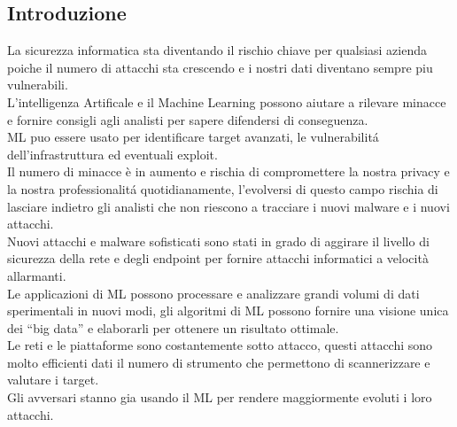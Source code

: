 \documentclass[../tesi.tex]{subfiles}
\begin{document}
\subsection{Introduzione}
La sicurezza informatica sta diventando il rischio chiave per qualsiasi azienda poiche il numero di attacchi sta crescendo e i nostri dati diventano sempre piu vulnerabili.\\
L’intelligenza Artificale e il Machine Learning possono aiutare a rilevare minacce e fornire consigli agli analisti per sapere difendersi di conseguenza.\\
ML puo essere usato per identificare target avanzati, le vulnerabilitá dell’infrastruttura ed eventuali exploit.\\
Il numero di minacce è in aumento e rischia di compromettere la nostra privacy e la nostra professionalitá quotidianamente, l’evolversi di questo campo rischia di lasciare indietro gli analisti che non riescono a tracciare i nuovi malware e i nuovi attacchi.\\
Nuovi attacchi e malware sofisticati sono stati in grado di aggirare il livello di sicurezza della rete e degli endpoint per fornire attacchi informatici a velocità allarmanti.\\
Le applicazioni di ML possono processare e analizzare grandi volumi di dati sperimentali in nuovi modi, gli algoritmi di ML possono fornire una visione unica dei “big data” e elaborarli per ottenere un risultato ottimale.\\
Le reti e le piattaforme sono costantemente sotto attacco, questi attacchi sono molto efficienti dati il numero di strumento che permettono di scannerizzare e valutare i target.\\
Gli avversari stanno gia usando il ML per rendere maggiormente evoluti i loro attacchi.
\end{document}
